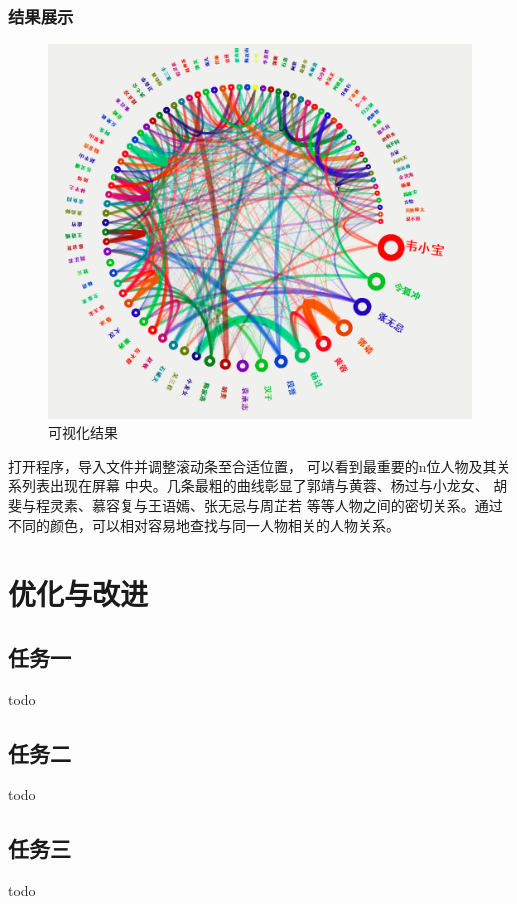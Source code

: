 \documentclass[a4paper,UTF8]{article}
\numberwithin{equation}{section}
\begin{document}
\subsubsection{结果展示}
\begin{figure}[htbp]
    \centering
    \includegraphics[width = 15cm]{task6-result.png}
    \caption{可视化结果}
    \label{task6-result}
\end{figure}
打开程序，导入文件并调整滚动条至合适位置，
可以看到最重要的n位人物及其关系列表出现在屏幕
中央。几条最粗的曲线彰显了郭靖与黄蓉、杨过与小龙女、
胡斐与程灵素、慕容复与王语嫣、张无忌与周芷若
等等人物之间的密切关系。通过不同的颜色，可以相对容易地查找与同一人物相关的人物关系。

\section{优化与改进}
\subsection{任务一}
todo

\subsection{任务二}
todo

\subsection{任务三}
todo
\end{document}

